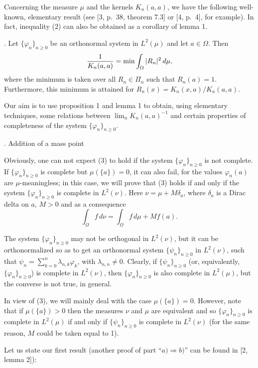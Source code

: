 \medskip

Concerning the measure $\mu$ and the kernels $K_n(a,a)$, we have the  
following well-known, elementary result (see [3, p.~38, theorem 7.3] or [4,
p.~4], for example). In fact, inequality (2) can also be obtained as a
corollary of lemma 1.

. Let $\{\varphi_n\}_{n \geq 0}$ be an orthonormal
system in $L^2(\mu)$ and let $a \in \Omega$. Then
$$
   {1 \over K_n(a,a)} = \min \int_{\Omega} |R_n|^2 \,d\mu,
$$
where the minimum is taken over all $R_n \in \Pi_n$ such that $R_n(a) = 1$.
Furthermore, this minimum is attained for $R_n(x) = K_n(x,a)/K_n(a,a)$.

Our aim is to use proposition 1 and lemma 1 to obtain, using elementary
techniques, some relations between $\displaystyle \lim_n K_n(a,a)^{-1}$ and
certain properties of completeness of the system $\{\varphi_n\}_{n\geq0}$.

\bigskip
\centerline {. Addition of a mass point}
\bigskip

Obviously, one can not expect (3) to hold if the system $\{\varphi_n\}_{n\geq
0}$ is not complete. If $\{\varphi_n\}_{n\geq 0}$ is complete but $\mu(\{a\}) =
0$, it can also fail, for the values $\varphi_n(a)$ are $\mu$-meaningless; in
this case, we will prove that (3) holds if and only if the system
$\{\varphi_n\}_{n\geq 0}$ is complete in $L^2(\nu)$. Here $\nu = \mu +
M\delta_a$, where $\delta_a$ is a Dirac delta on $a$, $M>0$ and as a consequence
$$
   \int_{\Omega} f \,d\nu = \int_{\Omega} f \,d\mu + M f(a).
$$

The system $\{\varphi_n\}_{n\geq 0}$ may not be orthogonal in $L^2(\nu)$, but
it can be orthonormalized so as to get an orthonormal system $\{\psi_n\}_{n\geq
0}$ in $L^2(\nu)$, such that $\psi_n = \displaystyle \sum_{k=0}^n
\lambda_{n,k} \varphi_k$, with $\lambda_{n,n} \not= 0$. Clearly, if
$\{\psi_n\}_{n\geq 0}$ (or, equivalently, $\{\varphi_n\}_{n\geq 0}$) is
complete in $L^2(\nu)$, then $\{\varphi_n\}_{n\geq 0}$ is also complete in
$L^2(\mu)$, but the converse is not true, in general.

In view of (3), we will mainly deal with the case $\mu(\{a\}) = 0$. However,
note that if $\mu(\{a\}) > 0$ then the measures $\nu$ and $\mu$ are equivalent
and so $\{\varphi_n\}_{n\geq 0}$ is complete in $L^2(\mu)$ if and only if
$\{\psi_n\}_{n\geq 0}$ is complete in $L^2(\nu)$ (for the same reason, $M$
could be taken equal to 1).

Let us state our first result (another proof of part ``$a) \Longrightarrow b)$''
can be found in [2, lemma 2]):

